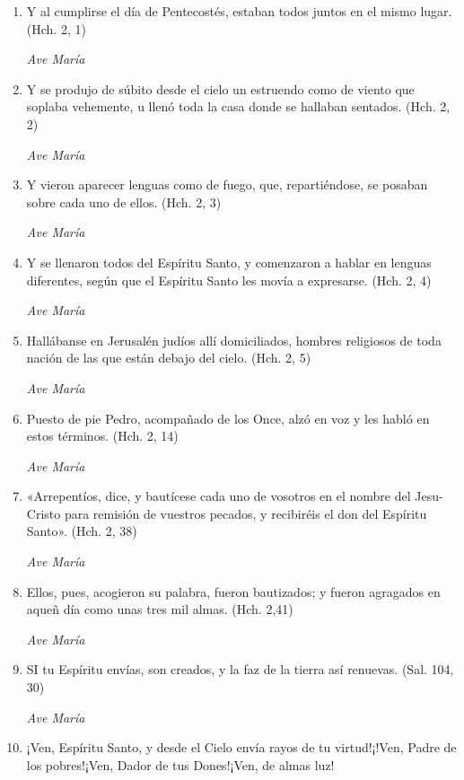 \documentclass[a4paper,11pt, oneside]{report}
\begin{document}
      \begin{enumerate}

        \item Y al cumplirse el día de Pentecostés, estaban todos juntos en el mismo lugar. (Hch. 2, 1)

        \textit{Ave María}

        \item Y se produjo de súbito desde el cielo un estruendo como de viento que soplaba vehemente, u llenó toda la casa
        donde se hallaban sentados. (Hch. 2, 2)

        \textit{Ave María}

        \item Y vieron aparecer lenguas como de fuego, que, repartiéndose, se posaban sobre cada uno de ellos. (Hch. 2, 3)

        \textit{Ave María}

        \item Y se llenaron todos del Espíritu Santo, y comenzaron a hablar en lenguas diferentes, según que el Espíritu Santo les movía
        a expresarse. (Hch. 2, 4)

        \textit{Ave María}

        \item Hallábanse en Jerusalén judíos allí domiciliados, hombres religiosos de toda nación de las que están debajo del cielo. (Hch. 2, 5)

        \textit{Ave María}

        \item Puesto de pie Pedro, acompañado de los Once, alzó en voz y les habló en estos términos. (Hch. 2, 14)

        \textit{Ave María}

        \item «Arrepentíos, dice, y bautícese cada uno de vosotros en el nombre del Jesu-Cristo para remisión de vuestros pecados, y recibiréis el don
        del Espíritu Santo». (Hch. 2, 38)

        \textit{Ave María}

        \item Ellos, pues, acogieron su palabra, fueron bautizados; y fueron agragados en aqueñ día como unas tres mil almas. (Hch. 2,41)

        \textit{Ave María}

        \item SI tu Espíritu envías, son creados, y la faz de la tierra así renuevas. (Sal. 104, 30)

        \textit{Ave María}

        \item ¡Ven, Espíritu Santo, y desde el Cielo envía rayos de tu virtud!¡!Ven, Padre de los pobres!¡Ven, Dador de tus Dones!¡Ven, de almas luz!
        
      \end{enumerate}
\end{document}
